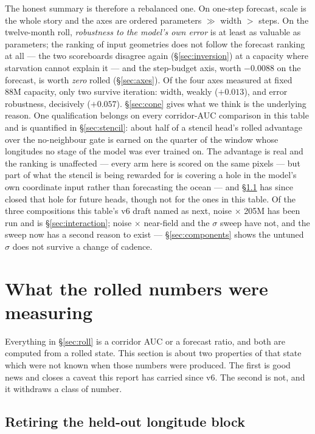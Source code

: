 \documentclass[10pt]{article}
\begin{document}
The honest summary is therefore a rebalanced one. On one-step forecast,
scale is the whole story and the axes are ordered parameters $\gg$ width
$>$ steps. On the twelve-month roll, \emph{robustness to the model's own
error} is at least as valuable as parameters; the ranking of input
geometries does not follow the forecast ranking at all --- the two
scoreboards disagree again (\S\ref{sec:inversion}) at a capacity where
starvation cannot explain it --- and the step-budget axis, worth
$-0.0088$ on the forecast, is worth \emph{zero} rolled
(\S\ref{sec:axes}). Of the four axes measured at fixed 88M capacity,
only two survive iteration: width, weakly ($+0.013$), and error
robustness, decisively ($+0.057$). \S\ref{sec:cone} gives what we think is
the underlying reason. One qualification belongs on every corridor-AUC
comparison in this table and is quantified in \S\ref{sec:stencil}: about
half of a stencil head's rolled advantage over the no-neighbour gate is
earned on the quarter of the window whose longitudes no stage of the
model was ever trained on. The advantage is real and the ranking is
unaffected --- every arm here is scored on the same pixels --- but part
of what the stencil is being rewarded for is covering a hole in the
model's own coordinate input rather than forecasting the ocean --- and
\S\ref{sec:nolonhold} has since closed that hole for future heads, though
not for the ones in this table. Of the three compositions this table's v6
draft named as next, noise $\times$ 205M has been run and is
\S\ref{sec:interaction}; noise $\times$ near-field and the $\sigma$ sweep
have not, and the sweep now has a second reason to exist ---
\S\ref{sec:components} shows the untuned $\sigma$ does not survive a
change of cadence.

\section{What the rolled numbers were measuring}\label{sec:measuring}

Everything in \S\ref{sec:roll} is a corridor AUC or a forecast ratio, and
both are computed from a rolled state. This section is about two properties
of that state which were not known when those numbers were produced. The
first is good news and closes a caveat this report has carried since v6.
The second is not, and it withdraws a class of number.

\subsection{Retiring the held-out longitude block}\label{sec:nolonhold}
\end{document}
